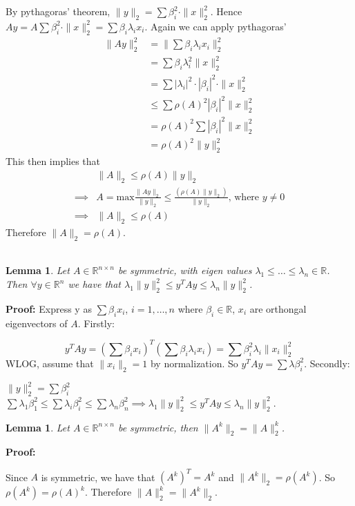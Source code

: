 \documentclass[titlepage]{article}
\theoremstyle{plain}
\newtheorem{lem}[thm]{Lemma}
\theoremstyle{definition}
\theoremstyle{remark}
\begin{document}
\noindent By pythagoras' theorem, $\|y\|_2 = \sum \beta_i^2 \cdot \|x\|_2^2$.
Hence $Ay = A \sum \beta_i^2 \cdot \|x\|_2^2 = \sum \beta_i \lambda_i x_i$.
Again we can apply pythagoras'
\begin{align*}
\|Ay\|_2^2 &= \|\sum \beta_i \lambda_i x_i\|_2^2\\
&= \sum \beta_i \lambda_i^2 \|x\|_2^2\\
&= \sum |\lambda_i|^2 \cdot |\beta_i|^2 \cdot \|x\|_2^2\\
&\leq \sum\rho(A)^2 |\beta_i|^2 \|x\|_2^2\\
&= \rho(A)^2 \sum |\beta_i|^2 \|x\|_2^2\\
&= \rho(A)^2 \|y\|_2^2
\end{align*}
This then implies that
\begin{align*}
&\|A\|_2 \leq \rho(A) \|y\|_2\\
\implies &A  = \text{max} \frac{\|Ay\|_2}{\|y\|_2} \leq \frac{(\rho(A)
\|y\|_2)}{\|y\|_2} \text{, where $y \not = 0$}\\
\implies &\|A\|_2 \leq \rho(A)
\end{align*}
Therefore $\|A\|_2 = \rho(A)$.\\\\
\begin{lem}
Let $A \in \mathbb{R}^{n \times n}$ be symmetric, with eigen values $\lambda_1
\leq \hdots \leq \lambda_n \in \mathbb{R}$. Then $\forall y \in \mathbb{R}^n$ we
have that $\lambda_1 \|y\|_2^2 \leq y^T A y \leq \lambda_n \|y\|_2^2$.
\end{lem}

\noindent \textbf{Proof: } Express y as $\sum \beta_i x_i$, $i = 1,\hdots,n$
where $\beta_i \in \mathbb{R}$, $x_i$ are orthongal eigenvectors of $A$.
Firstly:

\[y^TAy = (\sum \beta_i x_i)^T (\sum \beta_i \lambda_i x_i) = \sum \beta_i^2
\lambda_i \|x_i\|_2^2\]
WLOG, assume that $\|x_i\|_2 = 1$ by normalization. So $y^T A y = \sum \lambda
\beta_i^2$. Secondly:

$\|y\|_2^2 = \sum \beta_i^2$\\

$\sum \lambda_1 \beta_1^2 \leq \sum \lambda_i \beta_i^2 \leq \sum \lambda_n
\beta_n^2 \implies \lambda_1 \|y\|_2^2 \leq y^T A y \leq \lambda_n \|y\|_2^2$.
\begin{lem}
Let $A \in \mathbb{R}^{n\times n}$ be symmetric, then $\|A^k\|_2 = \|A\|_2^k$.
\end{lem}

\noindent \textbf{Proof: }

Since $A$ is symmetric, we have that $(A^k)^T = A^k$ and $\|A^k\|_2 =
\rho(A^k)$. So $\rho(A^k) = \rho(A)^k$. Therefore $\|A\|_2^k =\|A^k\|_2$.
\end{document}
